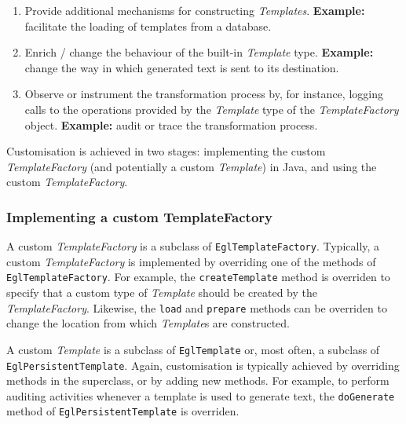 \begin{enumerate}
	\item Provide additional mechanisms for constructing \emph{Templates}. 
	      \textbf{Example:} facilitate the loading of templates from a database.
	\item Enrich / change the behaviour of the built-in \emph{Template} type.
	      \textbf{Example:} change the way in which generated text is sent to its destination.
	\item Observe or instrument the transformation process by, for instance, logging calls to
	      the operations provided by the \emph{Template} type of the \emph{TemplateFactory}
	      object.
	      \textbf{Example:} audit or trace the transformation process.
\end{enumerate}

Customisation is achieved in two stages: implementing the custom \emph{TemplateFactory} 
(and potentially a custom \emph{Template}) in Java, and using the custom 
\emph{TemplateFactory}. 

\subsubsection{Implementing a custom TemplateFactory}
A custom \emph{TemplateFactory} is a subclass of \texttt{EglTemplateFactory}. Typically, 
a custom \emph{TemplateFactory} is implemented by overriding one of the methods of 
\texttt{EglTemplateFactory}. For example, the \texttt{createTemplate} method is 
overriden to specify that a custom type of \emph{Template} should be created by the \emph{TemplateFactory}. Likewise, the \texttt{load} and \texttt{prepare} methods can
be overriden to change the location from which \emph{Template}s are constructed.

A custom \emph{Template} is a subclass of \texttt{EglTemplate} or, most often, a 
subclass of \texttt{EglPersistentTemplate}. Again, customisation is typically 
achieved by overriding methods in the superclass, or by adding new methods. For 
example, to perform auditing activities whenever a template is used to generate
text, the \texttt{doGenerate} method of \texttt{EglPersistentTemplate} is
overriden.


